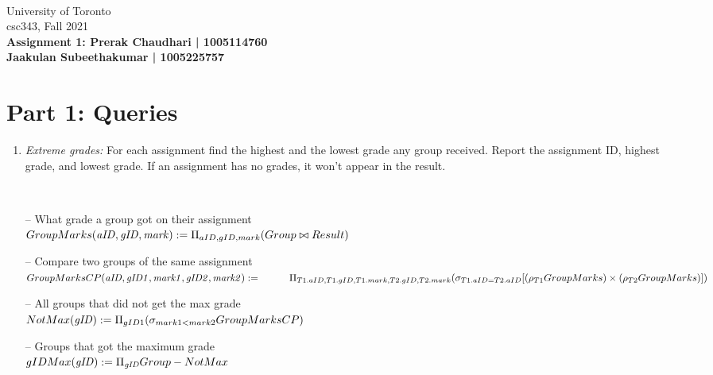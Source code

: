\documentclass{article}
\newcommand{\var}[1]{\mathit{#1}}
\begin{document}
~~~\vspace{-2.0cm}

\noindent
University of Toronto\\
{\sc csc}343, Fall 2021\\[10pt]
{\LARGE\bf Assignment 1: \newline Prerak Chaudhari | 1005114760 \\[1mm] Jaakulan Subeethakumar | 1005225757}

\section*{Part 1: Queries}

\begin{enumerate}
\item   %
\textit{Extreme grades:} For each assignment find the highest and the lowest grade any group received.
Report the assignment ID, highest grade, and lowest grade.
If an assignment has no grades, it won't appear in the result.

{~}\\ %
{\large %
-- What grade a group got on their assignment \\[5pt]
$
GroupMarks(\var{aID, gID, mark}) := 
	\Pi_{aID, gID, mark}
	(Group \bowtie Result) \\[10pt]
$

-- Compare two groups of the same assignment \\[5pt]
$
GroupMarksCP(\var{aID, gID1, mark1, gID2, mark2}) := \\[5pt]
    \hspace*{1cm}
	\Pi_{T1.aID, T1.gID, T1.mark, T2.gID, T2.mark}
	(\sigma_{T1.aID = T2.aID} 
	[(\rho_{T1}GroupMarks) \times (\rho_{T2}GroupMarks)]) \\[10pt]
$

-- All groups that did not get the max grade \\[5pt]
$
NotMax(\var{gID}) :=
	\Pi_{gID1}
	(\sigma_{mark1 < mark2} 
	GroupMarksCP) \\[10pt]
$

-- Groups that got the maximum grade \\[5pt]
$
gIDMax(\var{gID}) := 
	\Pi_{\var{gID}} 
	Group
	-
	NotMax \\[10pt]
$

}
\end{enumerate}
\end{document}
